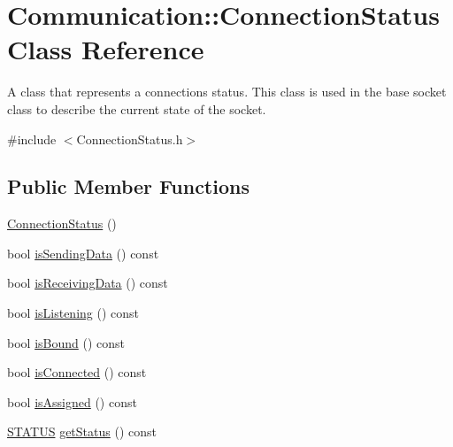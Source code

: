 \hypertarget{class_communication_1_1_connection_status}{}\section{Communication\+:\+:Connection\+Status Class Reference}
\label{class_communication_1_1_connection_status}


A class that represents a connections status. This class is used in the base socket class to describe the current state of the socket.  




{\ttfamily \#include $<$Connection\+Status.\+h$>$}

\subsection*{Public Member Functions}
\begin{DoxyCompactItemize}
\item 
\hyperlink{class_communication_1_1_connection_status_a2fd4bbdadb8a1564a06e0192020ae6a1}{Connection\+Status} ()
\item 
bool \hyperlink{class_communication_1_1_connection_status_aa4f4bdf5d044a9905fe6d711e2755b33}{is\+Sending\+Data} () const 
\item 
bool \hyperlink{class_communication_1_1_connection_status_a148fb3bd4a95a92efb0bb78051124ef6}{is\+Receiving\+Data} () const 
\item 
bool \hyperlink{class_communication_1_1_connection_status_a101f64e8a51669c752cf3de4b0317812}{is\+Listening} () const 
\item 
bool \hyperlink{class_communication_1_1_connection_status_a1091dfab9b442a559344c2fe83d450c3}{is\+Bound} () const 
\item 
bool \hyperlink{class_communication_1_1_connection_status_ae2c68bf6faea24f7e8d0e1e06662d1a5}{is\+Connected} () const 
\item 
bool \hyperlink{class_communication_1_1_connection_status_afe3618523181a963fc2d72128b42aa79}{is\+Assigned} () const 
\item 
\hyperlink{namespace_communication_a8dc059cf785da5e0d245141c4f8a6a9c}{S\+T\+A\+T\+U\+S} \hyperlink{class_communication_1_1_connection_status_acfdcf1ed0579d0e561c27b89b776a5ec}{get\+Status} () const 
\end{DoxyCompactItemize}
